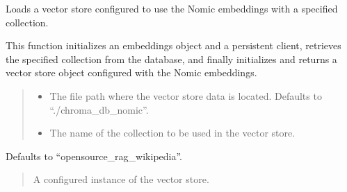 \documentclass[letterpaper,10pt,english,openany,oneside]{sphinxmanual}
\begin{document}
\begin{fulllineitems}
\label{\detokenize{data_storage:tools.pipeline.load_vectorstore_nomic}}
\pysigstartsignatures
{}
\pysigstopsignatures
\sphinxAtStartPar
Loads a vector store configured to use the Nomic embeddings with a specified collection.

\sphinxAtStartPar
This function initializes an embeddings object and a persistent client, retrieves the specified
collection from the database, and finally initializes and returns a  vector store object
configured with the Nomic embeddings.
\begin{quote}\begin{description}
\begin{itemize}
\item {} 
\sphinxAtStartPar
{} \textendash{} The file path where the vector store data is located. Defaults to “./chroma\_db\_nomic”.

\item {} 
\sphinxAtStartPar
{} \textendash{} The name of the collection to be used in the vector store.

\end{itemize}

\end{description}\end{quote}

\sphinxAtStartPar
Defaults to “opensource\_rag\_wikipedia”.
\begin{quote}\begin{description}
\sphinxAtStartPar
A configured instance of the  vector store.

\end{description}\end{quote}

\end{fulllineitems}
\end{document}
